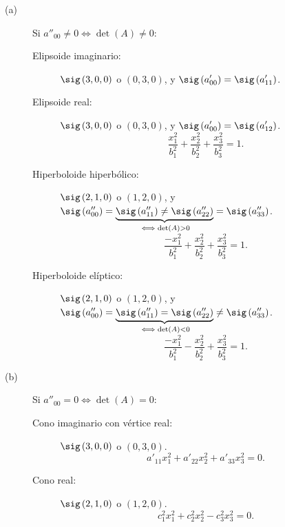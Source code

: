 \begin{description}
\item[(a)] Si $\displaystyle a''_{00} \neq 0 \iff \det\left(A\right) \neq 0 $:
\begin{description}
\item[Elipsoide imaginario:] $\displaystyle \sig\left(3, 0, 0\right) $ o $\displaystyle \left(0, 3, 0\right) $, y $\displaystyle \sig\left(a'_{00}\right) = \sig\left(a'_{11}\right) $. 
\item[Elipsoide real:] $\displaystyle \sig \left(3, 0, 0\right) $ o $\displaystyle \left(0, 3, 0\right) $, y $\displaystyle \sig\left(a'_{00}\right) = \sig\left(a'_{12}\right) $.
	\[\frac{x^{2}_{1}}{b^{2}_{1}}+\frac{x^{2}_{2}}{b^{2}_{2}}+\frac{x^{2}_{3}}{b^{2}_{3}} = 1 .\]
\item[Hiperboloide hiperbólico:] $\displaystyle \sig\left(2, 1, 0\right) $ o $\displaystyle \left(1, 2, 0\right) $, y $\displaystyle \sig\left(a''_{00}\right) = \underbrace{\sig\left(a''_{11}\right) \neq \sig\left(a''_{22}\right)}_{\iff \det\left(A\right)>0} = \sig\left(a''_{33}\right) $. 
	\[\frac{-x^{2}_{1}}{b^{2}_{1}}+\frac{x^{2}_{2}}{b^{2}_{2}}+\frac{x^{2}_{3}}{b^{2}_{3}} = 1 .\]
\item[Hiperboloide elíptico:] $\displaystyle \sig\left(2, 1, 0\right) $ o $\displaystyle \left(1, 2, 0\right) $, y $\displaystyle \sig\left(a''_{00}\right) =\underbrace{ \sig\left(a''_{11}\right) = \sig\left(a''_{22}\right)}_{\iff \det\left(A\right) < 0} \neq \sig\left(a''_{33}\right) $.
	\[\frac{-x^{2}_{1}}{b^{2}_{1}}-\frac{x^{2}_{2}}{b^{2}_{2}}+\frac{x^{2}_{3}}{b^{2}_{3}} = 1 .\]
\end{description}
\item[(b)] Si $\displaystyle a''_{00} = 0 \iff \det\left(A\right) = 0 $:
	\begin{description}
	\item[Cono imaginario con vértice real:] $\displaystyle \sig\left(3, 0, 0\right) $ o $\displaystyle \left(0, 3, 0\right) $.
		\[a'_{11}x^{2}_{1}+a'_{22}x^{2}_{2}+a'_{33}x^{2}_{3} = 0 .\]
	\item[Cono real:] $\displaystyle \sig\left(2, 1, 0\right) $ o $\displaystyle \left(1,2, 0\right) $.
		\[c^{2}_{1}x^{2}_{1}+c^{2}_{2}x^{2}_{2}-c^{2}_{3}x^{2}_{3} = 0 .\]
	\end{description}
\end{description}
